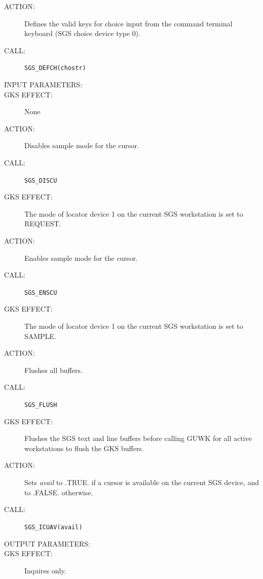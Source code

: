 \documentclass[11pt]{article}
\begin{document}
\begin{description}
\item [ACTION:]
Defines the valid keys for choice input from the command terminal
keyboard (SGS choice device type 0).
\item [CALL:]
{\tt SGS\_DEFCH(chostr)}
\item [INPUT PARAMETERS:]
\begin{params}
\end{params}
\item [GKS EFFECT:]
None
\end{description}
\goodbreak

\begin{description}
\item [ACTION:]
Disables sample mode for the cursor.
\item [CALL:]
{\tt SGS\_DISCU}
\item [GKS EFFECT:]
The mode of locator device 1 on the current SGS workstation is set to REQUEST.
\end{description}
\goodbreak

\begin{description}
\item [ACTION:]
Enables sample mode for the cursor.
\item [CALL:]
{\tt SGS\_ENSCU}
\item [GKS EFFECT:]
The mode of locator device 1 on the current SGS workstation is set to SAMPLE.
\end{description}
\goodbreak

\begin{description}
\item [ACTION:]
Flushes all buffers.
\item [CALL:]
{\tt SGS\_FLUSH}
\item [GKS EFFECT:]
Flushes the SGS text and line buffers before calling GUWK for all active
workstations to flush the GKS buffers.
\end{description}
\goodbreak

\begin{description}
\item [ACTION:]
Sets {\em avail}\/ to .TRUE. if a cursor is available on the current SGS device,
and to .FALSE. otherwise.
\item [CALL:]
{\tt SGS\_ICUAV(avail)}
\item [OUTPUT PARAMETERS:]
\begin{params}
\end{params}
\item [GKS EFFECT:]
Inquires only.
\end{description}
\goodbreak
\end{document}
